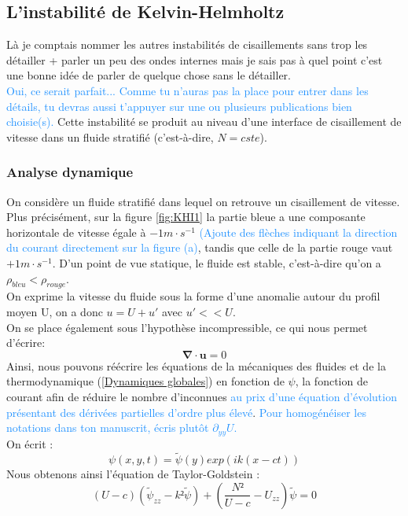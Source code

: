 \documentclass{rapportECC}
\newcommand{\FAadd}[1]{\textcolor{DodgerBlue}{{#1}}}                     %
\begin{document}
\subsection{L'instabilité de Kelvin-Helmholtz}
\label{KHI}
Là je comptais nommer les autres instabilités de cisaillements sans trop les détailler + parler un peu des ondes internes mais je sais pas à quel point c'est une bonne idée de parler de quelque chose sans le détailler.\\ \FAadd{Oui, ce serait parfait... Comme tu n'auras pas la place pour entrer dans les détails, tu devras aussi t'appuyer sur une ou plusieurs publications bien choisie(s).}
Cette instabilité se produit au niveau d'une interface de cisaillement de vitesse dans un fluide stratifié (c'est-à-dire, $N = cste$). \\

\subsubsection{Analyse dynamique}

On considère un fluide stratifié dans lequel on retrouve un cisaillement de vitesse. Plus précisément, sur la figure \ref{fig:KHI1} la partie bleue a une composante horizontale de vitesse égale à $-1 m \cdot s^{-1}$ \FAadd{(Ajoute des flèches indiquant la direction du courant directement sur la figure (a)}, tandis que celle de la partie rouge vaut $+1 m \cdot s^{-1}$. D'un point de vue statique, le fluide est stable, c'est-à-dire qu'on a $\rho_{bleu} < \rho_{rouge}$. \\
On exprime la vitesse du fluide sous la forme d'une anomalie autour du profil moyen U, on a donc $u = U+u'$ avec $u'<<U$. \\
On se place également sous l'hypothèse incompressible, ce qui nous permet d'écrire: 
\begin{equation}
    \mathbf{\nabla} \cdot \mathbf{u} = 0
\end{equation}
Ainsi, nous pouvons réécrire les équations de la mécaniques des fluides et de la thermodynamique (\ref{Dynamiques globales}) en fonction de $\psi$, la fonction de courant afin de réduire le nombre d'inconnues \FAadd{au prix d'une équation d'évolution présentant des dérivées partielles d'ordre plus élevé}. \FAadd{Pour homogénéiser les notations dans ton manuscrit, écris plutôt $\partial_{yy}U$.}
\\
On écrit :
\begin{equation}
    \psi(x,y,t) = \tilde{\psi}(y)exp(ik(x-ct))
    \label{eq: fct courant}
\end{equation}
Nous obtenons ainsi l'équation de Taylor-Goldstein : \\
\begin{equation}
    (U - c)(\tilde{\psi}_{zz} - k²\tilde{\psi}) + (\frac{N²}{U - c} - U_{zz})\tilde{\psi} = 0
    \label{eq: taylor goldstein}
\end{equation}
\end{document}
